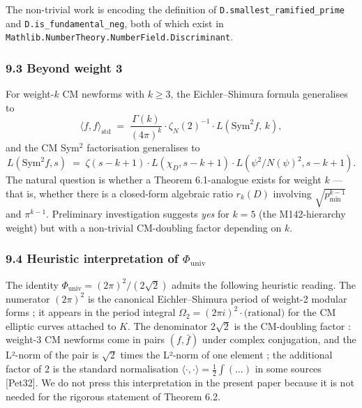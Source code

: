 \documentclass[
  11pt,
  a4paper,
]{amsart}
\begin{document}
The non-trivial work is encoding the definition of \texttt{D.smallest\_ramified\_prime} and \texttt{D.is\_fundamental\_neg}, both of which exist in \texttt{Mathlib.NumberTheory.NumberField.Discriminant}.

\hypertarget{beyond-weight-3}{%
\subsubsection{9.3 Beyond weight 3}\label{beyond-weight-3}}

For weight-\(k\) CM newforms with \(k \ge 3\), the Eichler--Shimura formula generalises to
\[
\langle f, f\rangle_{\mathrm{std}} \;=\; \frac{\Gamma(k)}{(4\pi)^{k}}\cdot \zeta_N(2)^{-1}\cdot L(\mathrm{Sym}^{2} f,\, k),
\]
and the CM Sym\(^{2}\) factorisation generalises to
\[
L(\mathrm{Sym}^{2} f, s) \;=\; \zeta(s - k + 1)\cdot L(\chi_D, s - k + 1)\cdot L(\psi^{2}/N(\psi)^{2}, s - k + 1).
\]
The natural question is whether a Theorem 6.1-analogue exists for weight \(k\) --- that is, whether there is a closed-form algebraic ratio \(r_k(D)\) involving \(\sqrt{p_{\min}^{k-1}}\) and \(\pi^{k-1}\). Preliminary investigation suggests \emph{yes} for \(k = 5\) (the M142-hierarchy weight) but with a non-trivial CM-doubling factor depending on \(k\).

\hypertarget{heuristic-interpretation-of-phi_mathrmuniv}{%
\subsubsection{\texorpdfstring{9.4 Heuristic interpretation of \(\Phi_{\mathrm{univ}}\)}{9.4 Heuristic interpretation of \textbackslash Phi\_\{\textbackslash mathrm\{univ\}\}}}\label{heuristic-interpretation-of-phi_mathrmuniv}}

The identity \(\Phi_{\mathrm{univ}} = (2\pi)^{2}/(2\sqrt 2)\) admits the following heuristic reading. The numerator \((2\pi)^{2}\) is the canonical Eichler--Shimura period of weight-2 modular forms ; it appears in the period integral \(\Omega_2 = (2\pi i)^{2}\cdot \text{(rational)}\) for the CM elliptic curves attached to \(K\). The denominator \(2\sqrt 2\) is the CM-doubling factor : weight-3 CM newforms come in pairs \((f, \bar f)\) under complex conjugation, and the L²-norm of the pair is \(\sqrt 2\) times the L²-norm of one element ; the additional factor of \(2\) is the standard normalisation \(\langle\cdot,\cdot\rangle = \frac{1}{2}\int(\ldots)\) in some sources {[}Pet32{]}. We do not press this interpretation in the present paper because it is not needed for the rigorous statement of Theorem 6.2.
\end{document}
